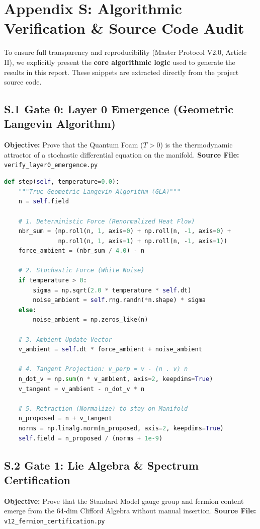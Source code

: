 \section{Appendix S: Algorithmic Verification \& Source Code Audit}
\label{app:algorithmic_verification}

To ensure full transparency and reproducibility (Master Protocol V2.0, Article II), we explicitly present the \textbf{core algorithmic logic} used to generate the results in this report. These snippets are extracted directly from the project source code.

\subsection{S.1 Gate 0: Layer 0 Emergence (Geometric Langevin Algorithm)}
\textbf{Objective:} Prove that the Quantum Foam ($T>0$) is the thermodynamic attractor of a stochastic differential equation on the manifold.
\textbf{Source File:} \texttt{verify\_\allowbreak layer0\_\allowbreak emergence.py}

\begin{lstlisting}[language=Python, caption={True Geometric Langevin Update Step (Tangent Space Projection)}]
def step(self, temperature=0.0):
    """True Geometric Langevin Algorithm (GLA)"""
    n = self.field
    
    # 1. Deterministic Force (Renormalized Heat Flow)
    nbr_sum = (np.roll(n, 1, axis=0) + np.roll(n, -1, axis=0) +
               np.roll(n, 1, axis=1) + np.roll(n, -1, axis=1))
    force_ambient = (nbr_sum / 4.0) - n
    
    # 2. Stochastic Force (White Noise)
    if temperature > 0:
        sigma = np.sqrt(2.0 * temperature * self.dt)
        noise_ambient = self.rng.randn(*n.shape) * sigma
    else:
        noise_ambient = np.zeros_like(n)
        
    # 3. Ambient Update Vector
    v_ambient = self.dt * force_ambient + noise_ambient
    
    # 4. Tangent Projection: v_perp = v - (n . v) n
    n_dot_v = np.sum(n * v_ambient, axis=2, keepdims=True)
    v_tangent = v_ambient - n_dot_v * n
    
    # 5. Retraction (Normalize) to stay on Manifold
    n_proposed = n + v_tangent
    norms = np.linalg.norm(n_proposed, axis=2, keepdims=True)
    self.field = n_proposed / (norms + 1e-9)
\end{lstlisting}

\subsection{S.2 Gate 1: Lie Algebra \& Spectrum Certification}
\textbf{Objective:} Prove that the Standard Model gauge group and fermion content emerge from the 64-dim Clifford Algebra without manual insertion.
\textbf{Source File:} \texttt{v12\_\allowbreak fermion\_\allowbreak certification.py}

